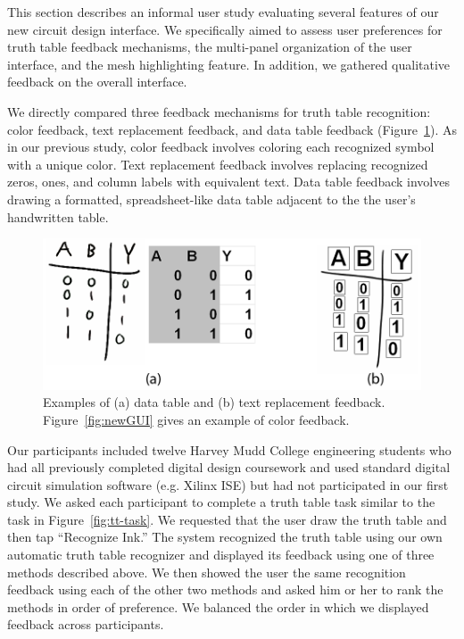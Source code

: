 \documentclass{elsart}
\begin{document}
This section describes an informal user study evaluating several
features of our new circuit design interface.  We specifically aimed to
assess user preferences for truth table feedback mechanisms, the
multi-panel organization of the user interface, and the mesh
highlighting feature.  In addition, we gathered qualitative feedback on
the overall interface.

We directly compared three feedback mechanisms
for truth table recognition: color feedback, text replacement
feedback, and data table feedback (Figure~\ref{fig:ttFeedback}).    As in
our previous study, color feedback involves coloring each recognized
symbol with a unique color.  Text replacement feedback involves
replacing recognized zeros, ones, and column labels with equivalent
text.  Data table feedback involves drawing a formatted,
spreadsheet-like data table adjacent to the the user's handwritten
table.

\begin{figure}[tb]
 \centering
 \includegraphics[width=.9\linewidth]{mockTruthTableFeedback.png}
 \caption{\label{fig:ttFeedback} Examples of (a) data table
          and (b) text replacement feedback.  Figure~\ref{fig:newGUI}
          gives an example of color feedback. }
\end{figure}

Our participants included twelve Harvey Mudd College engineering
students who had all previously completed digital design coursework
and used standard digital circuit simulation software (e.g. Xilinx
ISE) but had not participated in our first study.  We asked each
participant to complete a truth table task similar to the task in
Figure~\ref{fig:tt-task}.  We requested that the user draw the truth
table and then tap ``Recognize Ink.''  The system recognized the truth
table using our own automatic truth table recognizer and displayed its
feedback using one of three methods described above.  We then showed
the user the same recognition feedback using each of the other two
methods and asked him or her to rank the methods in order of
preference.  We balanced the order in which we displayed feedback
across participants.
\end{document}
